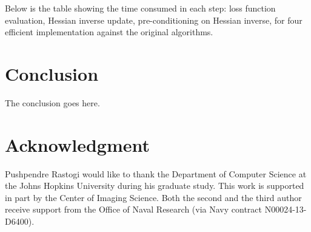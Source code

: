 \documentclass[conference]{IEEEtran}
\begin{document}
Below is the table showing the time consumed in each step: loss function evaluation, Hessian inverse update, pre-conditioning on Hessian inverse, for four efficient implementation against the original algorithms.



\section{Conclusion}
The conclusion goes here.


\section*{Acknowledgment}
Pushpendre Rastogi would like to thank the Department of Computer Science at the Johns Hopkins University during his graduate study. This work is supported in part by the Center of Imaging Science. Both the second and the third author receive support from the Office of Naval Research (via Navy contract N00024-13-D6400).


\end{document}
